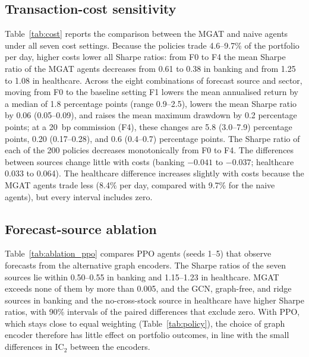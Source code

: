 


\subsection{Transaction-cost sensitivity}\label{subsec:cost}

{\color{blue}Table~\ref{tab:cost} reports the comparison between the MGAT and naive agents under all seven cost settings. Because the policies trade 4.6--9.7\% of the portfolio per day, higher costs lower all Sharpe ratios: from F0 to F4 the mean Sharpe ratio of the MGAT agents decreases from 0.61 to 0.38 in banking and from 1.25 to 1.08 in healthcare. Across the eight combinations of forecast source and sector, moving from F0 to the baseline setting F1 lowers the mean annualised return by a median of 1.8 percentage points (range 0.9--2.5), lowers the mean Sharpe ratio by 0.06 (0.05--0.09), and raises the mean maximum drawdown by 0.2 percentage points; at a 20~bp commission (F4), these changes are 5.8 (3.0--7.9) percentage points, 0.20 (0.17--0.28), and 0.6 (0.4--0.7) percentage points. The Sharpe ratio of each of the 200 policies decreases monotonically from F0 to F4. The differences between sources change little with costs (banking $-0.041$ to $-0.037$; healthcare 0.033 to 0.064). The healthcare difference increases slightly with costs because the MGAT agents trade less (8.4\% per day, compared with 9.7\% for the naive agents), but every interval includes zero.\par}



\subsection{Forecast-source ablation}\label{subsec:ablation}

{\color{blue}Table~\ref{tab:ablation_ppo} compares PPO agents (seeds 1--5) that observe forecasts from the alternative graph encoders. The Sharpe ratios of the seven sources lie within 0.50--0.55 in banking and 1.15--1.23 in healthcare. MGAT exceeds none of them by more than 0.005, and the GCN, graph-free, and ridge sources in banking and the no-cross-stock source in healthcare have higher Sharpe ratios, with 90\% intervals of the paired differences that exclude zero. With PPO, which stays close to equal weighting (Table~\ref{tab:policy}), the choice of graph encoder therefore has little effect on portfolio outcomes, in line with the small differences in IC$_2$ between the encoders.\par}


